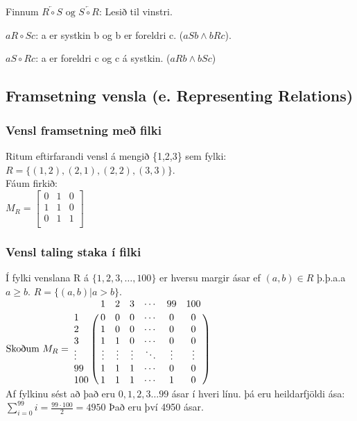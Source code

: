 Finnum $\underleftarrow{R\circ S} \text{ og } \underleftarrow{S\circ R}$: Lesið til vinstri.

$aR \circ Sc$: a er systkin b og b er foreldri c. ($aSb \wedge bRc$).

$aS \circ Rc$: a er foreldri c og c á systkin. ($aRb \wedge bSc$)

\newpage
\setcounter{subsection}{2}
\subsection{Framsetning vensla (e. Representing Relations)}

\subsubsection{Vensl framsetning með filki}
Ritum eftirfarandi vensl á mengið \{1,2,3\} sem fylki:\\
$R = \{(1,2), (2,1), (2,2), (3,3)\}$.\\
Fáum firkið:\vspace*{0.5em}\\ 
$M_R = \begin{bmatrix}
    0 & 1 & 0 \\
    1 & 1 & 0 \\
    0 & 1 & 1 \\
\end{bmatrix}$

\subsubsection{Vensl taling staka í filki}
Í fylki venslana R á $\{1,2,3,\ldots , 100\}$ er hversu margir ásar ef $(a,b) \in R$ þ.þ.a.a $a \geq b$. $R = \{(a,b)|a > b\}$.\vspace*{0.5em}\\
\(
\text{Skoðum }M_R = \bordermatrix{
    & 1 & 2 & 3 & \cdots & 99 & 100 \cr
    1 & 0 & 0 & 0 & \cdots & 0 & 0 \cr
    2 & 1 & 0 & 0 & \cdots & 0 & 0 \cr
    3 & 1 & 1 & 0 & \cdots & 0 & 0 \cr
    \vdots & \vdots & \vdots & \vdots & \ddots & \vdots & \vdots \cr
    99 & 1 & 1 & 1 & \cdots & 0 & 0 \cr
    100 & 1 & 1 & 1 & \cdots & 1 & 0 \cr
}
\)\vspace*{1em} \\
Af fylkinu sést að það eru $0,1,2,3 \ldots 99$ ásar í hveri línu. þá eru heildarfjöldi ása:\\
$\displaystyle \sum_{i=0}^{99}i = \frac{99 \cdot 100}{2} = 4950$ Það eru því 4950 ásar. 

